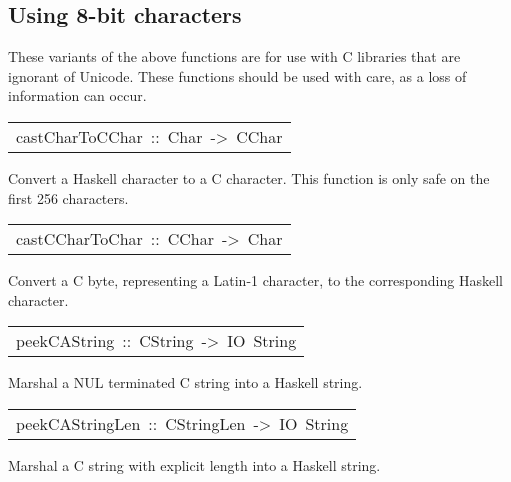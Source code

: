 \subsection{Using 8-bit characters
}
These variants of the above functions are for use with C libraries
 that are ignorant of Unicode.  These functions should be used with
 care, as a loss of information can occur.
\par

\begin{haddockdesc}
\item[\begin{tabular}{@{}l}
castCharToCChar\ ::\ Char\ ->\ CChar
\end{tabular}]\haddockbegindoc
Convert a Haskell character to a C character.
 This function is only safe on the first 256 characters.
\par

\end{haddockdesc}
\begin{haddockdesc}
\item[\begin{tabular}{@{}l}
castCCharToChar\ ::\ CChar\ ->\ Char
\end{tabular}]\haddockbegindoc
Convert a C byte, representing a Latin-1 character, to the corresponding
 Haskell character.
\par

\end{haddockdesc}
\begin{haddockdesc}
\item[\begin{tabular}{@{}l}
peekCAString\ ::\ CString\ ->\ IO\ String
\end{tabular}]\haddockbegindoc
Marshal a NUL terminated C string into a Haskell string.
\par

\end{haddockdesc}
\begin{haddockdesc}
\item[\begin{tabular}{@{}l}
peekCAStringLen\ ::\ CStringLen\ ->\ IO\ String
\end{tabular}]\haddockbegindoc
Marshal a C string with explicit length into a Haskell string.
\par

\end{haddockdesc}
